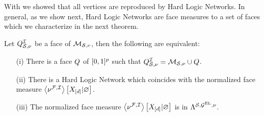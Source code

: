 
With  we showed that all vertices are reproduced by Hard Logic Networks.
In general, as we show next, Hard Logic Networks are face measures to a set of faces which we characterize in the next theorem.

\begin{theorem}
    \label{the:faceMeasureHardLogicNetworks}
    Let $Q^{\mathcal{I}}_{\mathcal{S},\nu}$ be a face of $\mathcal{M}_{\mathcal{S},\nu}$, then the following are equivalent:
    \begin{itemize}
        \item[(i)] There is a face $Q$ of $[0,1]^{p}$ such that $Q^{\mathcal{I}}_{\mathcal{S},\nu}=\mathcal{M}_{\mathcal{S},\nu}\cup Q$.
        \item[(ii)] There is a Hard Logic Network which coincides with the normalized face measure $\left\langle \nu^{\mathcal{F},\mathcal{I}}\right\rangle \left[ X_{[d]} | \varnothing \right]$.
        \item[(iii)] The normalized face measure $\left\langle \nu^{\mathcal{F},\mathcal{I}}\right\rangle \left[ X_{[d]} | \varnothing \right]$ is in $\Lambda^{\mathcal{S},\mathcal{G}^{\mathrm{EL}},\nu}$.
    \end{itemize}
\end{theorem}
